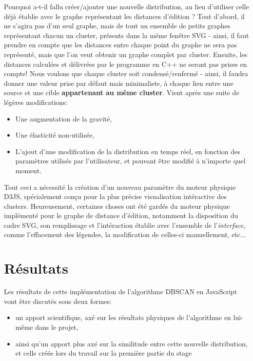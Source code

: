 \documentclass[12pt]{report}
\begin{document}
\begin{spacing}{1.2}
Pourquoi a-t-il fallu créer/ajouter une nouvelle distribution, au lieu d'utiliser celle déjà établie avec le graphe représentant les distances d'édition ?
\newline
Tout d'abord, il ne s'agira pas d'un seul graphe, mais de tout un ensemble de petits graphes représentant chacun un cluster, présents dans la même fenêtre SVG - ainsi, il faut prendre en compte que les distances entre chaque point du graphe ne sera pas représenté, mais que l'on veut obtenir un graphe complet par cluster.
\newline
Ensuite, les distances calculées et délivrées par le programme en C++ ne seront pas prises en compte! Nous voulons que chaque cluster soit condensé/renfermé - ainsi, il faudra donner une valeur prise par défaut mais minimaliste, à chaque lien entre une source et une cible \textbf{appartenant au même cluster}.
\newline
Vient après une suite de légères modifications:
	\begin{itemize}
	\item{Une augmentation de la gravité,}
	\item{Une élasticité non-utilisée,}
	\item{L'ajout d'une modification de la distribution en temps réel, en fonction des paramètres utilisés par l'utilisateur, et pouvant être modifié à n'importe quel moment.}
	\end{itemize}
Tout ceci a nécessité la création d'un nouveau paramètre du moteur physique D3JS, spécialement conçu pour la plus précise visualisation intéractive des clusters.
\newline
Heureusement, certaines choses ont été gardés du moteur physique implémenté pour le graphe de distance d'édition, notamment la disposition du cadre SVG, son remplissage et l'intéraction établie avec l'ensemble de l'\textit{interface}, comme l'effacement des légendes, la modification de celles-ci manuellement, etc...

\section{Résultats}

Les résultats de cette implémentation de l'algorithme DBSCAN en JavaScript vont être discutés sous deux formes:
	\begin{itemize}
	\item{un apport scientifique, axé sur les résultats physiques de l'algorithme en lui-même dans le projet,}
	\item{ainsi qu'un apport plus axé sur la similitude entre cette nouvelle distribution, et celle créée lors du travail sur la première partie du stage}
	\end{itemize}


\end{spacing}
\end{document}
